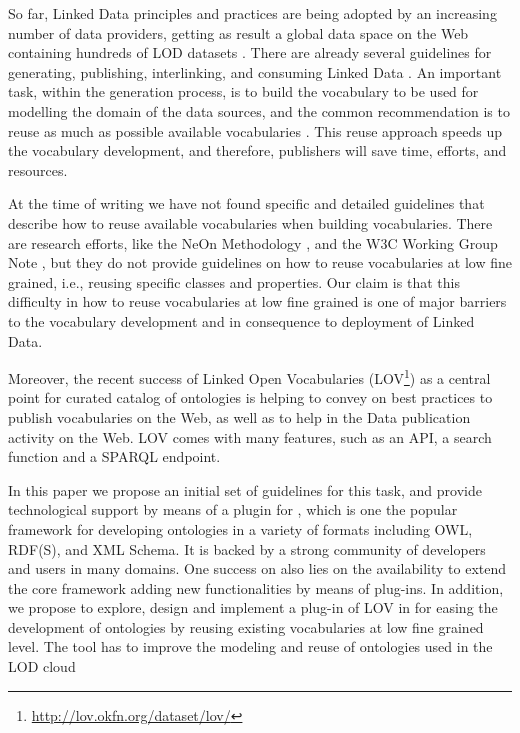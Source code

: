 So far, Linked Data principles and practices are being adopted by an increasing number of data providers, getting as result a global data space on the Web containing hundreds of LOD datasets \cite{Heath_Bizer_2011}. There are already several guidelines for generating, publishing, interlinking, and consuming Linked Data \cite{}. An important task, within the generation process, is to build the vocabulary to be used for modelling the domain of the data sources, and the common recommendation is to reuse as much as possible available vocabularies \cite{}. This reuse approach speeds up the vocabulary development, and therefore, publishers will save time, efforts, and resources. 

At the time of writing we have not found specific and detailed guidelines that describe how to reuse available vocabularies when building vocabularies. There are research efforts, like the NeOn Methodology \cite{}, and the W3C Working Group Note \cite{}, but they do not provide guidelines on how to reuse vocabularies at low fine grained, i.e., reusing specific classes and properties. Our claim is that this difficulty in how to reuse vocabularies at low fine grained is one of major barriers to the vocabulary development and in consequence to deployment of Linked Data.

Moreover, the recent success of Linked Open Vocabularies (LOV\footnote{\url{http://lov.okfn.org/dataset/lov/}}) as a central point for curated catalog of ontologies is helping to convey on best practices to publish vocabularies on the Web, as well as to help in the Data publication activity on the Web. LOV comes with many features, such as an API, a search function and a SPARQL endpoint.

In this paper we propose an initial set of guidelines for this task, and provide technological support by means of a plugin for \protege, which is one the popular framework for developing ontologies in a variety of formats including OWL, RDF(S), and XML Schema. It is backed by a strong community of developers and users in many domains. One success on \protege also lies on the availability to extend the core framework adding new functionalities by means of plug-ins. In addition, we propose to explore, design and implement a plug-in of LOV in \protege for easing the development of ontologies by reusing existing vocabularies at low fine grained level. The tool has to improve the modeling and reuse of ontologies used in the LOD cloud



